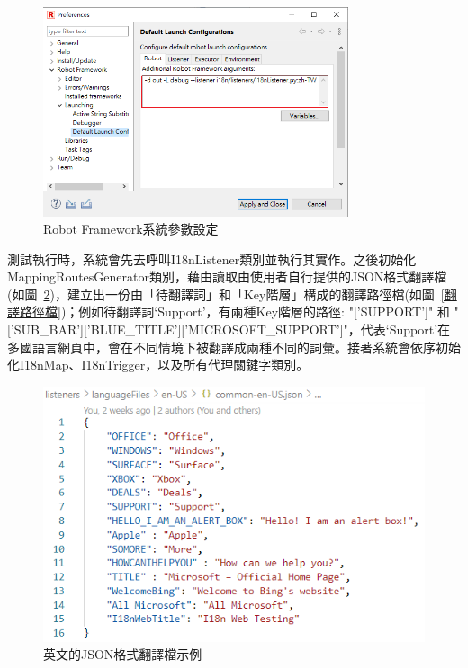 \begin{figure}[H]
    \centering
    \includegraphics[width= 0.8\textwidth]{../論文截圖/3-1-3-1 設定系統參數.png}
    \caption{Robot Framework系統參數設定}
    \label{rfSysArgsSetting}
\end{figure}
測試執行時，系統會先去呼叫I18nListener類別並執行其實作。之後初始化MappingRoutesGenerator類別，藉由讀取由使用者自行提供的JSON格式翻譯檔(如圖~\ref{英文的JSON格式翻譯檔示例})，建立出一份由「待翻譯詞」和「Key階層」構成的翻譯路徑檔(如圖~\ref{翻譯路徑檔})；例如待翻譯詞‘Support’，有兩種Key階層的路徑: "['SUPPORT']" 和 "['SUB\_BAR']['BLUE\_TITLE']['MICROSOFT\_SUPPORT']"，代表‘Support’在多國語言網頁中，會在不同情境下被翻譯成兩種不同的詞彙。接著系統會依序初始化I18nMap、I18nTrigger，以及所有代理關鍵字類別。

\begin{figure}[H]
    \centering
    \includegraphics[width= .7\textwidth]{../論文截圖/3-1-3-2 JSON格式翻譯檔.png}
    \caption{英文的JSON格式翻譯檔示例}
    \label{英文的JSON格式翻譯檔示例}
\end{figure}

